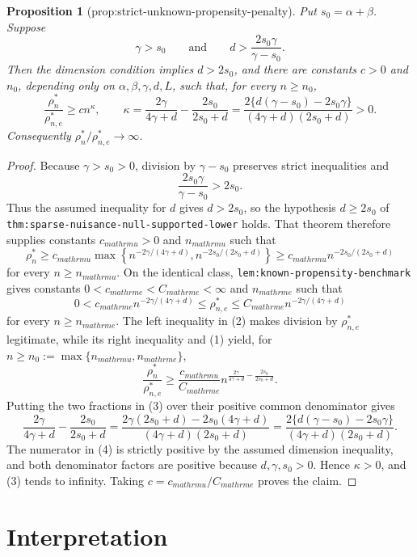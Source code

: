 \documentclass{article}
\newtheorem{proposition}{Proposition}
\begin{document}
\begin{proposition}[prop:strict-unknown-propensity-penalty]\label{prop:strict-unknown-propensity-penalty}
Put \(s_0=\alpha+\beta\).  Suppose
\[
 \gamma>s_0
 \qquad\text{and}\qquad
 d>\frac{2s_0\gamma}{\gamma-s_0}.
\]
Then the dimension condition implies \(d>2s_0\), and there are constants \(c>0\) and \(n_0\), depending only on \(\alpha,\beta,\gamma,d,L\), such that, for every \(n\ge n_0\),
\[
 \frac{\rho_n^*}{\rho_{n,e}^*}
 \ge c n^{\kappa},
 \qquad
 \kappa=
 \frac{2\gamma}{4\gamma+d}
 -\frac{2s_0}{2s_0+d}
 =\frac{2\{d(\gamma-s_0)-2s_0\gamma\}}
 {(4\gamma+d)(2s_0+d)}>0.
\]
Consequently \(\rho_n^*/\rho_{n,e}^*\to\infty\).
\end{proposition}
\begin{proof}
Because \(\gamma>s_0>0\), division by \(\gamma-s_0\) preserves strict inequalities and
\[
 \frac{2s_0\gamma}{\gamma-s_0}>2s_0.
\]
Thus the assumed inequality for \(d\) gives \(d>2s_0\), so the hypothesis \(d\ge 2s_0\) of \texttt{thm:sparse-nuisance-null-supported-lower} holds.  That theorem therefore supplies constants \(c_{mathrm u}>0\) and \(n_{mathrm u}\) such that
\[
 \rho_n^*
 \ge c_{mathrm u}
 \max\left\{n^{-2\gamma/(4\gamma+d)},
 n^{-2s_0/(2s_0+d)}\right\}
 \ge c_{mathrm u}n^{-2s_0/(2s_0+d)}
 \tag{1}
\]
for every \(n\ge n_{mathrm u}\).  On the identical class, \texttt{lem:known-propensity-benchmark} gives constants \(0<c_{mathrm e}<C_{mathrm e}<\infty\) and \(n_{mathrm e}\) such that
\[
 0<c_{mathrm e}n^{-2\gamma/(4\gamma+d)}
 \le \rho_{n,e}^*
 \le C_{mathrm e}n^{-2\gamma/(4\gamma+d)}
 \tag{2}
\]
for every \(n\ge n_{mathrm e}\).  The left inequality in (2) makes division by \(\rho_{n,e}^*\) legitimate, while its right inequality and (1) yield, for \(n\ge n_0:=\max\{n_{mathrm u},n_{mathrm e}\}\),
\[
 \frac{\rho_n^*}{\rho_{n,e}^*}
 \ge \frac{c_{mathrm u}}{C_{mathrm e}}
 n^{\frac{2\gamma}{4\gamma+d}-\frac{2s_0}{2s_0+d}}.
 \tag{3}
\]
Putting the two fractions in (3) over their positive common denominator gives
\[
 \frac{2\gamma}{4\gamma+d}-\frac{2s_0}{2s_0+d}
 =\frac{2\gamma(2s_0+d)-2s_0(4\gamma+d)}
 {(4\gamma+d)(2s_0+d)}
 =\frac{2\{d(\gamma-s_0)-2s_0\gamma\}}
 {(4\gamma+d)(2s_0+d)}.
 \tag{4}
\]
The numerator in (4) is strictly positive by the assumed dimension inequality, and both denominator factors are positive because \(d,\gamma,s_0>0\).  Hence \(\kappa>0\), and (3) tends to infinity.  Taking \(c=c_{mathrm u}/C_{mathrm e}\) proves the claim.
\end{proof}

\section{Interpretation}
\end{document}
